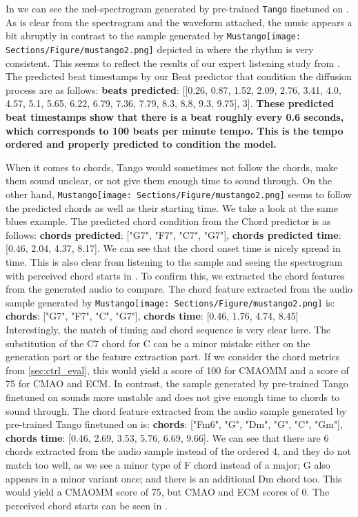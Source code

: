 \documentclass[11pt]{article}
\newcommand{\model}{\texttt{Mustango}}
\newcommand{\modelemoji}{\model{}\texttt{[image: Sections/Figure/mustango2.png]}}
\begin{document}
In  we can see the mel-spectrogram generated by pre-trained \texttt{Tango} finetuned on \dataset{}. As is clear from the spectrogram and the waveform attached, the music appears a bit abruptly in contrast to the sample generated by \modelemoji{} depicted in  where the rhythm is very consistent. This seems to reflect the results of our expert listening study from . The predicted beat timestamps by our Beat predictor that condition the diffusion process are as follows:
\textbf{beats predicted}: [[0.26, 0.87, 1.52, 2.09, 2.76, 3.41, 4.0, 4.57, 5.1, 5.65, 6.22, 6.79, 7.36, 7.79, 8.3, 8.8, 9.3, 9.75], 3].
\textbf{These predicted beat timestamps show that there is a beat roughly every 0.6 seconds, which corresponds to 100 beats per minute tempo. This is the tempo ordered and properly predicted to condition the model.}

When it comes to chords, Tango would sometimes not follow the chords, make them sound unclear, or not give them enough time to sound through. On the other hand, \modelemoji{} seems to follow the predicted chords as well as their starting time. We take a look at the same blues example. The predicted chord condition from the Chord predictor is as follows:
\textbf{chords predicted}: ["G7", "F7", "C7", "G7"], \textbf{chords predicted time}: [0.46, 2.04, 4.37, 8.17].
We can see that the chord onset time is nicely spread in time. This is also clear from listening to the sample and seeing the spectrogram with perceived chord starts in . To confirm this, we extracted the chord features from the generated audio to compare.
The chord feature extracted from the audio sample generated by \modelemoji{} is:
\textbf{chords}: ["G7", "F7", "C", "G7"], \textbf{chords time}: [0.46, 1.76, 4.74, 8.45]
Interestingly, the match of timing and chord sequence is very clear here. The substitution of the C7 chord for C can be a minor mistake either on the generation part or the feature extraction part. If we consider the chord metrics from \cref{sec:ctrl_eval}, this would yield a score of 100 for CMAOMM and a score of 75 for CMAO and ECM.
In contrast, the sample generated by pre-trained Tango finetuned on \dataset{} sounds more unstable and does not give enough time to chords to sound through.
The chord feature extracted from the audio sample generated by pre-trained Tango finetuned on \dataset{} is:
\textbf{chords}: ["Fm6", "G", "Dm", "G", "C", "Gm"], \textbf{chords time}: [0.46, 2.69, 3.53, 5.76, 6.69, 9.66]. We can see that there are 6 chords extracted from the audio sample instead of the ordered 4, and they do not match too well, as we see a minor type of F chord instead of a major; G also appears in a minor variant once; and there is an additional Dm chord too. This would yield a CMAOMM score of 75, but CMAO and ECM scores of 0. The perceived chord starts can be seen in .
\end{document}
